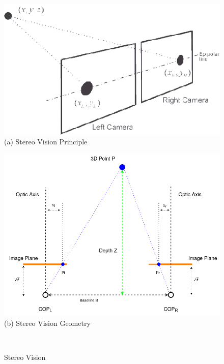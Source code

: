 \begin{figure} [H]
	\centering
		\begin{minipage}{.5\textwidth}
			\centering
			\includegraphics[width=\linewidth]{../Images/Theoretical-Background/Stereo-vision-principle.png}\\
			{(a) Stereo Vision Principle }
		\end{minipage}%
		\begin{minipage}{.5\textwidth}
			\centering
			\includegraphics[width=\linewidth]{../Photos/stereo-math.png}\\
			{(b) Stereo Vision Geometry}
		\end{minipage}
    \hfill \break \\
	\decoRule
	\caption[Stereo Vision]{Stereo Vision}
	\label{fig:stereo-vision}
\end{figure}

